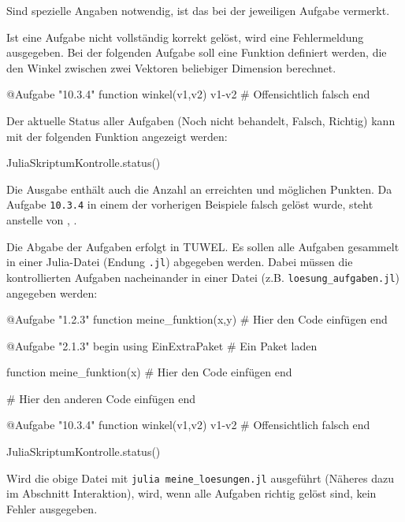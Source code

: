 Sind spezielle Angaben notwendig, ist das bei der jeweiligen Aufgabe vermerkt.

Ist eine Aufgabe nicht vollständig korrekt gelöst, wird eine Fehlermeldung ausgegeben.
Bei der folgenden Aufgabe soll eine Funktion definiert werden, die den Winkel zwischen zwei Vektoren beliebiger Dimension berechnet.

\begin{juliaconsole}
@Aufgabe "10.3.4" function winkel(v1,v2)
    v1-v2 # Offensichtlich falsch
end
\end{juliaconsole}

Der aktuelle Status aller Aufgaben (Noch nicht behandelt,  Falsch,  Richtig) kann mit der folgenden Funktion angezeigt werden:

\begin{juliaconsole}
JuliaSkriptumKontrolle.status()
\end{juliaconsole}

Die Ausgabe enthält auch die Anzahl an erreichten und möglichen Punkten.
Da Aufgabe \verb|10.3.4| in einem der vorherigen Beispiele falsch gelöst wurde, steht anstelle von
,
.

Die Abgabe der Aufgaben erfolgt in TUWEL.
Es sollen alle Aufgaben gesammelt in einer Julia-Datei (Endung \verb|.jl|) abgegeben werden.
Dabei müssen die kontrollierten Aufgaben nacheinander in einer Datei (z.B. \verb|loesung_aufgaben.jl|) angegeben werden:

\begin{jlverbatim}
@Aufgabe "1.2.3" function meine_funktion(x,y)
    # Hier den Code einfügen
end

@Aufgabe "2.1.3" begin
    using EinExtraPaket # Ein Paket laden

    function meine_funktion(x)
        # Hier den Code einfügen
    end

    # Hier den anderen Code einfügen
end

@Aufgabe "10.3.4" function winkel(v1,v2)
    v1-v2 # Offensichtlich falsch
end

JuliaSkriptumKontrolle.status()
\end{jlverbatim}

Wird die obige Datei mit \verb|julia meine_loesungen.jl| ausgeführt (Näheres dazu im Abschnitt Interaktion), wird, wenn alle Aufgaben richtig gelöst sind, kein Fehler ausgegeben.